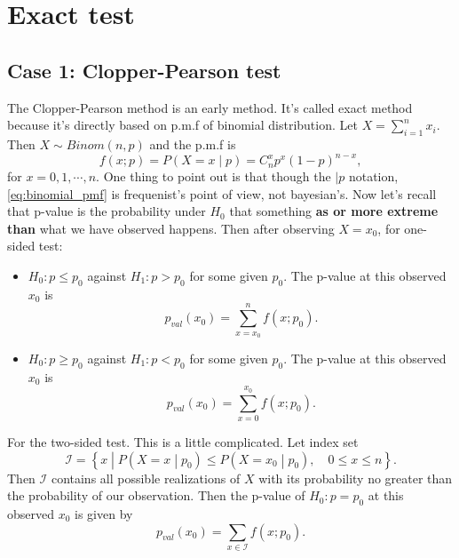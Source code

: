\documentclass[a4paper,12pt]{article}
\begin{document}
\section{Exact test}
\label{sec:exact-test}

\subsection{Case 1: Clopper-Pearson test}
\label{sec:case-1:-clopper}

The Clopper-Pearson method is an early method. It's called exact method because it's directly based on p.m.f of binomial distribution. Let $X = \sum\limits_{i = 1}^nx_i$. Then $X\sim Binom(n, p)$ and the p.m.f is
\begin{equation}
  \label{eq:binomial_pmf}
  f\left(x;p\right) = P\left(X = x\middle|p\right) = C_n^xp^x\left(1 - p\right)^{n - x}
  ,
\end{equation}
for $x = 0, 1, \cdots, n$. One thing to point out is that though the $|p$ notation, \eqref{eq:binomial_pmf} is frequenist's point of view, not bayesian's. Now let's recall that p-value is the probability under $H_0$ that something \textbf{as or more extreme than} what we have observed happens. Then after observing $X = x_0$, for one-sided test:
\begin{itemize}
\item $H_0: p \leq p_0$ against $H_1: p > p_0$ for some given $p_0$. The p-value at this observed $x_0$ is
  \begin{equation}
    \label{eq:clopper_pval_h0_leq}
    p_{val}\left(x_0\right) = \sum\limits_{x = x_0}^nf\left(x;p_0\right)
    .
  \end{equation}

\item $H_0: p \geq p_0$ against $H_1: p < p_0$ for some given $p_0$. The p-value at this observed $x_0$  is
  \begin{equation}
    \label{eq:clopper_pval_h0_geq}
    p_{val}\left(x_0\right) = \sum\limits_{x = 0}^{x_0}f\left(x;p_0\right)
    .    
  \end{equation}

\end{itemize}
For the two-sided test. This is a little complicated. Let index set
\[
  \mathcal{I} = \left\{
    x\middle|
    P\left(X = x\middle|p_0\right) \leq P\left(X = x_0\middle|p_0\right)
    ,\quad
    0\leq x \leq n
  \right\}
  .
\]
Then $\mathcal{I}$ contains all possible realizations of $X$ with its probability no greater than the probability of our observation. Then the p-value of $H_0: p = p_0$  at this observed $x_0$ is given by
\begin{equation}
  \label{eq:clopper_pval_h0_twosided}
  p_{val}\left(x_0\right) = \sum\limits_{x\in\mathcal{I}}f\left(x;p_0\right)
  . 
\end{equation}
\end{document}
